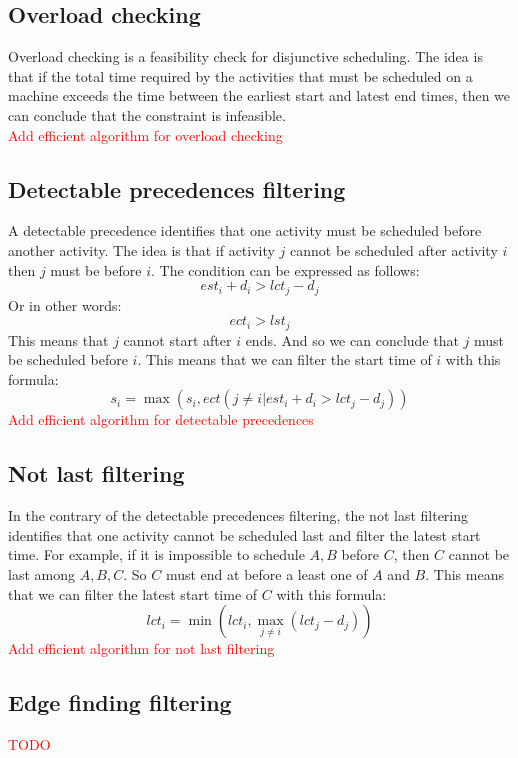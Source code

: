 \documentclass[12pt, openany]{report}
\theoremstyle{definition}
\begin{document}
\subsection{Overload checking}
Overload checking is a feasibility check for disjunctive scheduling. The idea is that if the total time required by the activities that must be scheduled on a machine exceeds the time between the earliest start and latest end times, then we can conclude that the constraint is infeasible.\\
\textcolor{red}{Add efficient algorithm for overload checking}
\subsection{Detectable precedences filtering}
A detectable precedence identifies that one activity must be scheduled before another activity. The idea is that if activity $j$ cannot be scheduled after activity $i$ then $j$ must be before $i$. The condition can be expressed as follows:
\begin{equation}
    est_i + d_i > lct_j - d_j
\end{equation}
Or in other words:
\begin{equation}
    ect_i > lst_j
\end{equation}
This means that $j$ cannot start after $i$ ends. And so we can conclude that $j$ must be scheduled before $i$. This means that we can filter the start time of $i$ with this formula:
\begin{equation}
    s_i = \max(s_i, ect({j \neq i | est_i + d_i > lct_j - d_j}))
\end{equation}
\textcolor{red}{Add efficient algorithm for detectable precedences}
\subsection{Not last filtering}
In the contrary of the detectable precedences filtering, the not last filtering identifies that one activity cannot be scheduled last and filter the latest start time. For example, if it is impossible to schedule ${A, B}$ before $C$, then $C$ cannot be last among ${A, B, C}$. So $C$ must end at before a least one of $A$ and $B$. This means that we can filter the latest start time of $C$ with this formula:
\begin{equation}
    lct_i = \min(lct_i, \max_{j \neq i}(lct_j - d_j))
\end{equation}
\textcolor{red}{Add efficient algorithm for not last filtering}
\subsection{Edge finding filtering}
\textcolor{red}{TODO}
\end{document}
